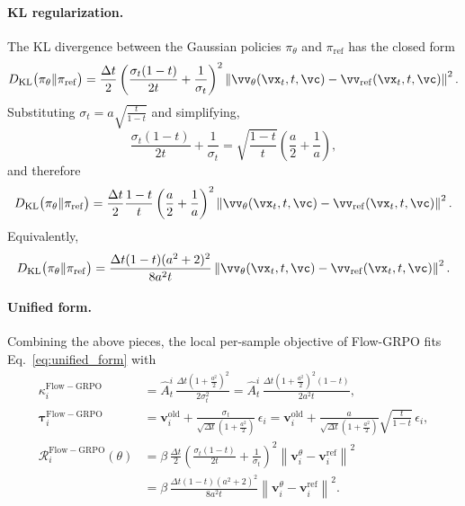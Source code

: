 \documentclass{article} %
\begin{document}
\paragraph{KL regularization.}
The KL divergence between the Gaussian policies
\(\pi_\theta\) and \(\pi_{\mathrm{ref}}\) has the closed form
\begin{equation}
D_{\mathrm{KL}}\bigl(\pi_\theta\|\pi_{\mathrm{ref}}\bigr)
=
\frac{\Delta t}{2}
\left(
\frac{\sigma_t(1-t)}{2t}
+
\frac{1}{\sigma_t}
\right)^2
\left\|
\vv_\theta(\vx_t,t,\vc)
-
\vv_{\mathrm{ref}}(\vx_t,t,\vc)
\right\|^2 .
\end{equation}
Substituting \(\sigma_t = a\sqrt{\frac{t}{1-t}}\) and simplifying,
\begin{equation}
\frac{\sigma_t(1-t)}{2t}
+
\frac{1}{\sigma_t}
=
\sqrt{\frac{1-t}{t}}
\left(
\frac{a}{2}
+
\frac{1}{a}
\right),
\end{equation}
and therefore
\begin{equation}
D_{\mathrm{KL}}\bigl(\pi_\theta\|\pi_{\mathrm{ref}}\bigr)
=
\frac{\Delta t}{2}
\frac{1-t}{t}
\left(
\frac{a}{2}
+
\frac{1}{a}
\right)^2
\left\|
\vv_\theta(\vx_t,t,\vc)
-
\vv_{\mathrm{ref}}(\vx_t,t,\vc)
\right\|^2 .
\end{equation}
Equivalently,
\begin{equation}
D_{\mathrm{KL}}\bigl(\pi_\theta\|\pi_{\mathrm{ref}}\bigr)
=
\frac{\Delta t (1-t)(a^2+2)^2}{8a^2 t}
\left\|
\vv_\theta(\vx_t,t,\vc)
-
\vv_{\mathrm{ref}}(\vx_t,t,\vc)
\right\|^2 .
\end{equation}

\paragraph{Unified form.}
Combining the above pieces, the local per-sample objective of Flow-GRPO
fits Eq.~\eqref{eq:unified_form} with
\begin{equation}
\boxed{
\begin{aligned}
\kappa_i^{\mathrm{Flow-GRPO}}
&=
\hat{A}^i_t\,
\frac{\Delta t\left(1+\frac{a^2}{2}\right)^2}{2\sigma_t^2}
=
\hat{A}^i_t\,
\frac{\Delta t\left(1+\frac{a^2}{2}\right)^2(1-t)}{2a^2 t},
\\
\bm{\tau}_i^{\mathrm{Flow-GRPO}}
&=
\mathbf{v}_i^{\mathrm{old}}
+
\frac{\sigma_t}
{\sqrt{\Delta t}\left(1+\frac{a^2}{2}\right)}\,\epsilon_i
=
\mathbf{v}_i^{\mathrm{old}}
+
\frac{a}
{\sqrt{\Delta t}\left(1+\frac{a^2}{2}\right)}
\sqrt{\frac{t}{1-t}}\,\epsilon_i,
\\
\mathcal{R}_i^{\mathrm{Flow-GRPO}}(\theta)
&=
\beta\,
\frac{\Delta t}{2}
\left(
\frac{\sigma_t(1-t)}{2t}
+
\frac{1}{\sigma_t}
\right)^2
\left\|
\mathbf{v}_i^\theta-\mathbf{v}_i^{\mathrm{ref}}
\right\|^2
\\
&=
\beta\,
\frac{\Delta t (1-t)(a^2+2)^2}{8a^2 t}
\left\|
\mathbf{v}_i^\theta-\mathbf{v}_i^{\mathrm{ref}}
\right\|^2 .
\end{aligned}
}
\end{equation}
\end{document}

